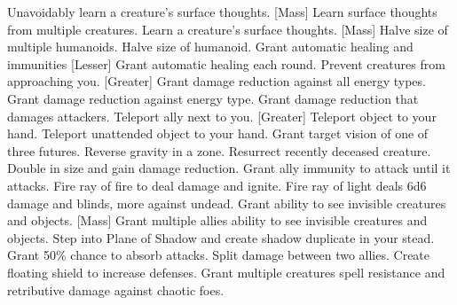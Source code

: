     {Unavoidably learn a creature's surface thoughts.}
[Mass]
    {Learn surface thoughts from multiple creatures.}
    {Learn a creature's surface thoughts.}
[Mass]
    {Halve size of multiple humanoids.}
    {Halve size of humanoid.}
    {Grant automatic healing and immunities}
[Lesser]
    {Grant automatic healing each round.}
    {Prevent creatures from approaching you.}
[Greater]
    {Grant damage reduction against all energy types.}
    {Grant damage reduction against energy type.}
    {Grant damage reduction that damages attackers.}
    {Teleport ally next to you.}
[Greater]
    {Teleport object to your hand.}
    {Teleport unattended object to your hand.}
    {Grant target vision of one of three futures.}
    {Reverse gravity in a zone.}
    {Resurrect recently deceased creature.}
    {Double in size and gain damage reduction.}
    {Grant ally immunity to attack until it attacks.}
    {Fire ray of fire to deal damage and ignite.}
    {Fire ray of light deals 6d6 damage and blinds, more against undead.}
    {Grant ability to see invisible creatures and objects.}
[Mass]
    {Grant multiple allies ability to see invisible creatures and objects.}
    {Step into Plane of Shadow and create shadow duplicate in your stead.}
    {Grant 50\% chance to absorb attacks.}
    {Split damage between two allies.}
    {Create floating shield to increase defenses.}
    {Grant multiple creatures spell resistance and retributive damage against chaotic foes.}
